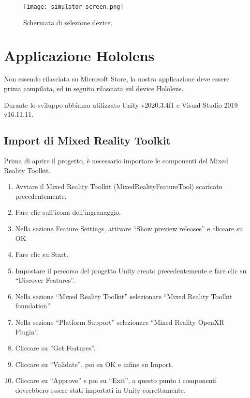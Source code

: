 \begin{figure}[H]
    \texttt{[image: simulator\_screen.png]}
    \centering
    \caption{\label{pic:simulator-deployment}Schermata di selezione device.}
\end{figure}

\section{Applicazione Hololens}
Non essendo rilasciata su Microsoft Store, la nostra applicazione deve essere prima compilata, ed in seguito rilasciata sul device Hololens.

Durante lo sviluppo abbiamo utilizzato Unity v2020.3.4f1 e Visual Studio 2019 v16.11.11.

\subsection{Import di Mixed Reality Toolkit}
Prima di aprire il progetto, è necessario importare le componenti del Mixed Reality Toolkit.
\begin{enumerate}
    \item Avviare il Mixed Reality Toolkit (MixedRealityFeatureTool) scaricato
precedentemente.
    \item Fare clic sull’icona dell’ingranaggio.
    \item  Nella sezione Feature Settings, attivare “Show preview releases” e cliccare su OK.
    \item Fare clic su Start.
    \item Impostare il percorso del progetto Unity creato precedentemente e fare clic su “Discover Features”.
    \item Nella sezione “Mixed Reality Toolkit” selezionare “Mixed Reality Toolkit foundation”
    \item Nella sezione “Platform Support” selezionare “Mixed Reality OpenXR Plugin”.
    \item Cliccare su ”Get Features”.
    \item Cliccare su “Validate”, poi su OK e infine su Import.
    \item Cliccare su “Approve” e poi su “Exit”, a questo punto i componenti dovrebbero essere stati importati in Unity correttamente.
\end{enumerate}

